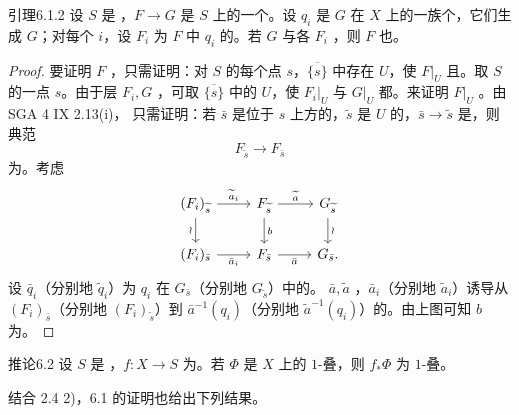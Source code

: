 \begin{SGAresult}{引理}{6.1.2}
设 $S$ 是 ，$F\to G$ 是 $S$ 上的一个。设 $q_i$ 是 $G$ 在 $X$ 上的一族个，它们生成 $G$；对每个 $i$，设 $F_i$ 为 $F$ 中 $q_i$ 的。若 $G$ 与各 $F_i$ ，则 $F$ 也。
\end{SGAresult}
\begin{proof}
要证明 $F$ ，只需证明：对 $S$ 的每个点 $s$，$\overline{\{s\}}$ 中存在 $U$，使 $F|_U$ 且。取 $S$ 的一点 $s$。由于层 $F_i,G$ ，可取 $\overline{\{s\}}$ 中的 $U$，使 $F_i|_U$ 与 $G|_U$ 都。来证明 $F|_U$ 。由 SGA 4 IX 2.13(i)，
只需证明：若 $\bar s$ 是位于 $s$ 上方的，$\widetilde s$ 是 $U$ 的，$\bar s\to\widetilde s$ 是，则典范
\[F_{\widetilde s}\longrightarrow F_{\bar s}\]
为。考虑
\[
\begin{tikzcd}
(F_i)_{\widetilde s}\arrow[r,"\widetilde a_i"]\arrow[d,"\wr"']&F_{\widetilde s}\arrow[r,"\widetilde a"]\arrow[d,"b"]&G_{\widetilde s}\arrow[d,"\wr"]\\
(F_i)_{\bar s}\arrow[r,"\bar a_i"']&F_{\bar s}\arrow[r,"\bar a"']&G_{\bar s}.
\end{tikzcd}
\]
设 $\bar q_i$（分别地 $\widetilde q_i$）为 $q_i$ 在 $G_{\bar s}$（分别地 $G_{\widetilde s}$）中的。 $\bar a,\widetilde a$ ，$\bar a_i$（分别地 $\widetilde a_i$）诱导从 $(F_i)_{\bar s}$（分别地 $(F_i)_{\widetilde s}$）到 $\bar a^{-1}(q_i)$（分别地 $\widetilde a^{-1}(q_i)$）的。由上图可知 $b$ 为。
\end{proof}

\begin{SGAresult}{推论}{6.2}
设 $S$ 是 ，$f:X\to S$ 为。若 $\Phi$ 是 $X$ 上的 $1$-叠，则 $f_*\Phi$ 为 $1$-叠。
\end{SGAresult}
结合 2.4 2)，6.1 的证明也给出下列结果。


